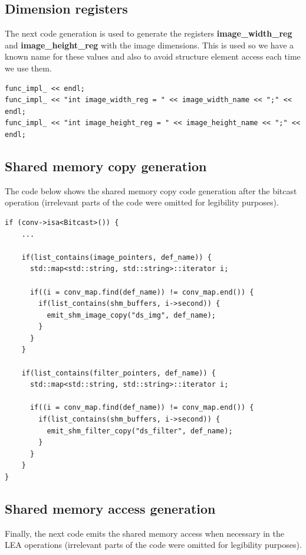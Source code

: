\documentclass{article}
\begin{document}
\subsection{Dimension registers}

The next code generation is used to generate the registers \textbf{image\_width\_reg} and \textbf{image\_height\_reg} with the image dimensions. This is used so we have a known name for these values and also to avoid structure element access each time we use them.

\begin{verbatim}
func_impl_ << endl;
func_impl_ << "int image_width_reg = " << image_width_name << ";" << endl;
func_impl_ << "int image_height_reg = " << image_height_name << ";" << endl;
\end{verbatim}

\subsection{Shared memory copy generation}

The code below shows the shared memory copy code generation after the bitcast operation (irrelevant parts of the code were omitted for legibility purposes).

\begin{verbatim}
if (conv->isa<Bitcast>()) {
    ...

    if(list_contains(image_pointers, def_name)) {
      std::map<std::string, std::string>::iterator i;

      if((i = conv_map.find(def_name)) != conv_map.end()) {
        if(list_contains(shm_buffers, i->second)) {
          emit_shm_image_copy("ds_img", def_name);
        }
      }
    }

    if(list_contains(filter_pointers, def_name)) {
      std::map<std::string, std::string>::iterator i;

      if((i = conv_map.find(def_name)) != conv_map.end()) {
        if(list_contains(shm_buffers, i->second)) {
          emit_shm_filter_copy("ds_filter", def_name);
        }
      }
    }
}
\end{verbatim}

\subsection{Shared memory access generation}

Finally, the next code emits the shared memory access when necessary in the LEA operations (irrelevant parts of the code were omitted for legibility purposes).
\end{document}
